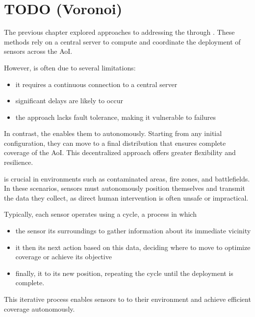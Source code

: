 \documentclass[a4paper, 12pt]{report}
\begin{document}
    \chapter{TODO (Voronoi)}

    The previous chapter explored approaches to addressing the  through . These methods rely on a central server to compute and coordinate the deployment of sensors across the AoI.

    However,  is often  due to several limitations:  

    \begin{itemize}
        \item it requires a continuous connection to a central server
        \item significant delays are likely to occur
        \item the approach lacks fault tolerance, making it vulnerable to failures
    \end{itemize}

    In contrast, the  enables them to  autonomously. Starting from any initial configuration, they can move to a final distribution that ensures complete coverage of the AoI. This decentralized approach offers greater flexibility and resilience.

     is crucial in  environments such as contaminated areas, fire zones, and battlefields. In these scenarios, sensors must autonomously position themselves and transmit the data they collect, as direct human intervention is often unsafe or impractical.  

    Typically, each sensor operates using a  cycle, a process in which

    \begin{itemize}
        \item the sensor  its surroundings to gather information about its immediate vicinity
        \item it then  its next action based on this data, deciding where to move to optimize coverage or achieve its objective
        \item finally, it  to its new position, repeating the cycle until the deployment is complete.  
    \end{itemize}

    This iterative process enables sensors to  to their environment and achieve efficient coverage autonomously.
\end{document}
